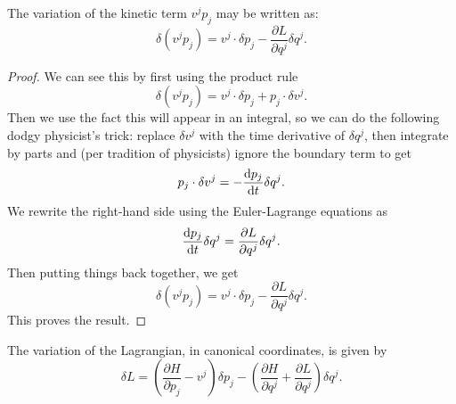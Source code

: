 \begin{lemma}\label{lemma:variation-of-kinetic-contribution}
  The variation of the kinetic term $v^{j}p_{j}$ may be written as:
  \begin{equation}
\delta(v^{j}p_{j}) = v^{j}\cdot\delta p_{j} -\frac{\partial L}{\partial q^{j}}\delta q^{j}.
  \end{equation}
\end{lemma}

\begin{proof}
  We can see this by first using the product rule
    \begin{equation}
\delta(v^{j}p_{j}) = v^{j}\cdot\delta p_{j} + p_{j}\cdot\delta v^{j}.
  \end{equation}
Then we use the fact this will appear in an integral, so we can do the
following dodgy physicist's trick: replace $\delta v^{j}$ with the time
derivative of $\delta q^{j}$, then
integrate by parts and (per tradition of physicists) ignore the boundary
term to get
\begin{equation}
p_{j}\cdot\delta v^{j} = -\frac{\mathrm{d} p_{j}}{\mathrm{d} t}\delta q^{j}.
\end{equation}
We rewrite the right-hand side using the Euler-Lagrange equations as
\begin{equation}
\frac{\mathrm{d} p_{j}}{\mathrm{d} t}\delta q^{j} = \frac{\partial L}{\partial q^{j}}\delta q^{j}.
\end{equation}
Then putting things back together, we get
\begin{equation}
\delta(v^{j}p_{j}) = v^{j}\cdot\delta p_{j} - \frac{\partial L}{\partial q^{j}}\delta q^{j}.
\end{equation}
This proves the result.
\end{proof}


\begin{theorem}
  The variation of the Lagrangian, in canonical coordinates, is given by
  \begin{equation}
\delta L = \left(\frac{\partial H}{\partial p_{j}}-v^{j}\right)\delta p_{j} -
\left(\frac{\partial H}{\partial q^{j}} + \frac{\partial L}{\partial q^{j}}\right)\delta q^{j}.
  \end{equation}
\end{theorem}

